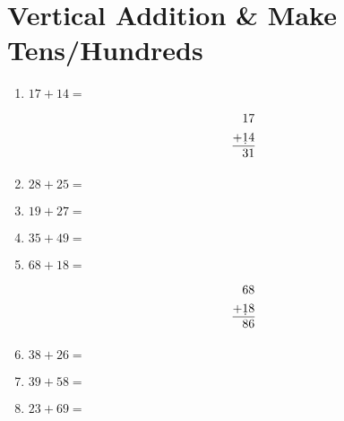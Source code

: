 \documentclass[a4paper,12pt]{article}
\begin{document}
\section*{\LARGE \center\textbf{Vertical Addition \& Make Tens/Hundreds}}
\vspace{1 cm}
\begin{multicols}{2}
\begin{enumerate}[label=\arabic*.]
    \item \textbf{\Large $17 + 14 =$} \underline{\hspace{2cm}} \vspace{0.1 cm}
    
    \[
\begin{aligned}
   & 17  \\
+  & \d{1}4  \\
\hline
   & 31  
\end{aligned}
\]

 \vspace{1.8 cm}
    \item \textbf{\Large $28 + 25 =$} \underline{\hspace{2cm}} \vspace{4.5cm}
    \item \textbf{\Large $19 + 27 =$} \underline{\hspace{2cm}} \vspace{4.5cm}
    \item \textbf{\Large $35 + 49 =$} \underline{\hspace{2cm}} \vspace{4.5cm}
    \item \textbf{\Large $68 + 18 =$} \underline{\hspace{2cm}} \vspace{.1cm}
    
        \[
\begin{aligned}
   & 68  \\
+  & \d{1}8  \\
\hline
   & 86  
\end{aligned}
\]
\vspace{1.8cm}
    \item \textbf{\Large $38 + 26 =$} \underline{\hspace{2cm}} \vspace{4.5cm}
    \item \textbf{\Large $39 + 58 =$} \underline{\hspace{2cm}} \vspace{4.5cm}
    \item \textbf{\Large $23 + 69 =$} \underline{\hspace{2cm}} \vspace{4.5cm} %
\end{enumerate}
\end{multicols}
\end{document}
